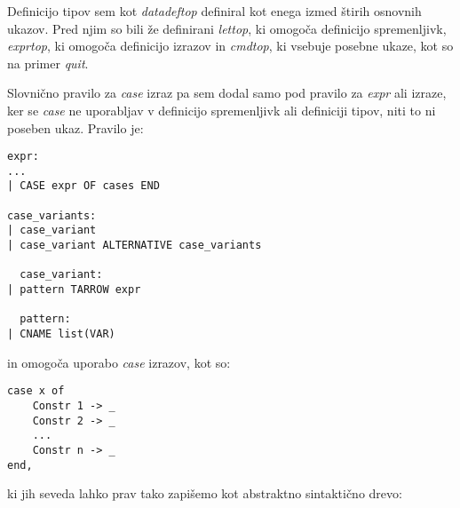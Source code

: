 \documentclass[12pt,a4paper,openany]{book}
\begin{document}
Definicijo tipov sem kot \emph{datadeftop} definiral kot enega izmed štirih osnovnih ukazov. Pred njim so bili že definirani \emph{lettop}, ki omogoča definicijo 
spremenljivk, \emph{exprtop}, ki omogoča definicijo izrazov in \emph{cmdtop}, ki vsebuje posebne ukaze, kot so na primer \emph{quit}.

Slovnično pravilo za \emph{case} izraz pa sem dodal samo pod pravilo za \emph{expr} ali izraze, ker se \emph{case} ne uporabljav v definicijo spremenljivk ali
definiciji tipov, niti to ni poseben ukaz. Pravilo je: 
\begin{lstlisting}
expr:
...
| CASE expr OF cases END

case_variants:
| case_variant
| case_variant ALTERNATIVE case_variants

  case_variant:
| pattern TARROW expr

  pattern:
| CNAME list(VAR)
\end{lstlisting}
in omogoča uporabo \emph{case} izrazov, kot so:
\begin{lstlisting}
case x of 
    Constr 1 -> _
    Constr 2 -> _
    ...
    Constr n -> _
end,
\end{lstlisting}
ki jih seveda lahko prav tako zapišemo kot abstraktno sintaktično drevo:
\begin{center}
\end{center}
\end{document}
